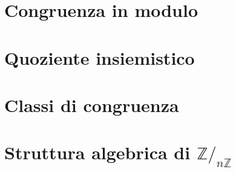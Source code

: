 \section{Congruenza in modulo}
\section{Quoziente insiemistico}
\section{Classi di congruenza}
\section{Struttura algebrica di $\mathbb{Z}/_{n\mathbb{Z}}$}

